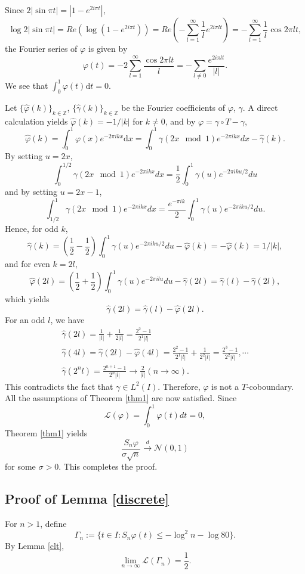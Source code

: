 \documentclass{amsart}
\theoremstyle{definition}
\begin{document}
Since  $2|\sin\pi t|=|1-e^{2i\pi t}|$,
$$\log 2|\sin\pi t|=Re(\log (1-e^{2i\pi t}))=
Re(-\sum_{l=1}^\infty\frac{1}{l}e^{2i\pi lt})=
-\sum_{l=1}^\infty\frac{1}{l}\cos 2\pi lt,$$
the Fourier series of $\varphi$ is given by
$$\varphi(t)=-2\sum_{l=1}^\infty\frac{\cos 2\pi l t}{l}
=-\sum_{l\ne0}\frac{e^{2i\pi lt}}{|l|}.$$
We see that $\int_0^1\varphi(t)\mathrm{d}t=0$. 

Let $\{\hat{\varphi}(k)\}_{k\in\mathbb{Z}}$, 
$\{\hat{\gamma}(k)\}_{k\in\mathbb{Z}}$ be 
the Fourier coefficients of $\varphi$, $\gamma$.
A direct calculation yields $\hat{\varphi}(k)=-1/|k|$ for $k\ne0$, 
and by \(\varphi = \gamma \circ T - \gamma\),
$$\hat{\varphi}(k)=\int_0^1\varphi(x)e^{-2\pi i k x}\mathrm{d}x=\int_0^1\gamma(2x\mod1)e^{-2\pi ikx}dx-\hat{\gamma}(k).$$
By setting $u=2x$,
$$\int_0^{1/2}\gamma(2x\mod1)e^{-2\pi ikx}dx
=\frac{1}{2}\int_0^1\gamma(u)e^{-2\pi iku/2}du$$
and by setting $u=2x-1$, 
$$\int_{1/2}^1\gamma(2x\mod1)e^{-2\pi ikx}dx
=\frac{e^{-\pi ik}}{2}\int_0^1\gamma(u)e^{-2\pi iku/2}du.$$
Hence, for odd $k$, 
$$\hat{\gamma}(k)=\left(\frac{1}{2}-\frac{1}{2}\right)
\int_0^1\gamma(u)e^{-2\pi iku/2}du-\hat{\varphi}(k)=-\hat{\varphi}(k)=1/|k|,$$
and for even $k=2l$,  
$$\hat{\varphi}(2l)=\left(\frac{1}{2}+\frac{1}{2}\right)
\int_0^1\gamma(u)e^{-2\pi i l u}du-\hat{\gamma}(2l)
=\hat{\gamma}(l)-\hat{\gamma}(2l),$$ 
which yields
$$\hat{\gamma}(2l)=\hat{\gamma}(l)-\hat{\varphi}(2l).$$
For an odd $l$, we have
$$\begin{array}{l}
\hat{\gamma}(2l)=\frac{1}{|l|}+\frac{1}{2|l|}=\frac{2^2-1}{2^1|l|}\\
\hat{\gamma}(4l)=\hat{\gamma}(2l)-\hat{\varphi}(4l)
=\frac{2^2-1}{2^1|l|}+\frac{1}{2^2|l|}
=\frac{2^3-1}{2^2|l|},\cdots\\
\hat{\gamma}(2^n l)=\frac{2^{n+1}-1}{2^n|l|}\to \frac{2}{|l|} (n\to\infty).
\end{array}$$
This contradicts the fact that $\gamma\in L^2(I)$.
Therefore, $\varphi$ is not a $T$-coboundary. 
All the assumptions of Theorem \ref{thm1} are now satisfied. Since
\[
\mathcal{L}(\varphi)=\int_0^1 \varphi(t)dt=0,
\]
Theorem \ref{thm1} yields
\[
\frac{S_n\varphi}{\sigma\sqrt n}
\overset{d}{\longrightarrow} \mathscr{N}(0,1)
\]
for some $\sigma>0$. This completes the proof.

\subsection{Proof of Lemma \ref{discrete}}

For $n>1$, define 
$$\Gamma_n:=\{t\in I : S_n\varphi(t)\le-\log^2 n-\log 80\}.$$
By Lemma \ref{clt},
\begin{equation}\label{cltmeas}
\lim_{n\to\infty} \mathcal{L}(\Gamma_n)=\frac{1}{2}.\end{equation}
\end{document}
